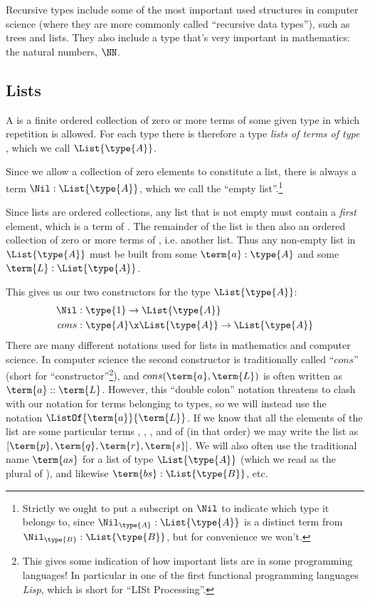 Recursive types include some of the most important used structures in computer science 
(where they are more commonly called ``recursive data types''), such as trees and lists.  They also include a type that's very important in mathematics: the natural numbers, $\NN$.



\subsection{Lists}

A  is a finite ordered collection of zero or more terms of some given type  in which repetition is allowed.  For each type  there is therefore a type \emph{lists of terms of type }, which we call $\List{\type{A}}$.

Since we allow a collection of zero elements to constitute a list, there is always a term $\Nil: \List{\type{A}}$, which we call the ``empty list''.\footnote{
Strictly we ought to put a subscript on $\Nil$ to indicate which type it belongs to, since 
$\Nil_{\type{A}}:\List{\type{A}}$
is a distinct term from 
$\Nil_{\type{B}}:\List{\type{B}}$, but for convenience we won't.
}

Since lists are ordered collections, any list that is not empty must contain a \emph{first} element, which is a term of .  The remainder of the list is then also an ordered collection of zero or more terms of , i.e. another list.  Thus any non-empty list in $\List{\type{A}}$ must be built from some $\term{a}:\type{A}$ and some $\term{L}:\List{\type{A}}$.

This gives us our two constructors for the type $\List{\type{A}}$:
\begin{align*}
\Nil&: \type{1} \to \List{\type{A}}  \\
cons&: \type{A} \x \List{\type{A}} \to \List{\type{A}}
\end{align*}
There are many different notations used for lists in mathematics and computer science.  In computer science the second constructor is traditionally called ``$cons$'' (short for ``constructor''\footnote{
This gives some indication of how important lists are in some programming languages!  In particular in one of the first functional programming languages \emph{Lisp}, which is short for ``LISt Processing''.
}), and $cons(\term{a}, \term{L})$ is often written as $\term{a}::\term{L}$.  However, this ``double colon'' notation threatens to clash with our notation for terms belonging to types, so we will instead use the notation $\ListOf{\term{a}}{\term{L}}$.  If we know that all the elements of the list are some particular terms 
, , , and  of  (in that order) we may write the list as 
$[\term{p}, \term{q}, \term{r}, \term{s}]$.
We will also often use the traditional name $\term{as}$ for a list of type $\List{\type{A}}$ (which we read as the plural of ), and likewise $\term{bs}:\List{\type{B}}$, etc.

